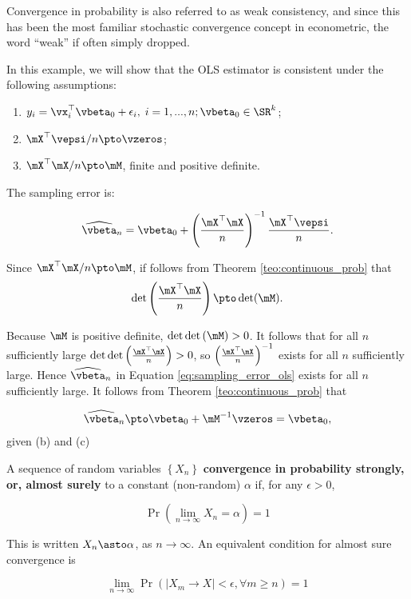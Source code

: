 \documentclass[english,12pt]{book}\usepackage[]{graphicx}\usepackage[]{xcolor}
\begin{document}
\begin{remark}
Convergence in probability is also referred to as weak consistency, and since this has been the most familiar stochastic convergence concept in econometric, the word ``weak'' if often simply dropped.
\end{remark}

\begin{example}\label{example:ols1}
In this example, we will show that the OLS estimator is consistent under the following assumptions:
\begin{enumerate}
\item $y_i = \vx_i^\top\vbeta_0 + \epsilon_i,\; i = 1, ..., n; \vbeta_0\in \SR^k$;
\item $\mX^\top\vepsi/n \pto \vzeros$;
\item $\mX^\top\mX/n\pto \mM$, finite and positive definite. 
\end{enumerate}

The sampling error is:

\begin{equation}\label{eq:sampling_error_ols}
\widehat{\vbeta}_n = \vbeta_0 + \left(\frac{\mX^\top\mX}{n}\right)^{-1}\frac{\mX^\top\vepsi}{n}.
\end{equation}

 Since $\mX^\top\mX/n\pto \mM$, if follows from Theorem \ref{teo:continuous_prob} that 
 \begin{equation}
 \det\left(\frac{\mX^\top\mX}{n}\right)\pto \det(\mM).
 \end{equation}

Because $\mM$ is positive definite, $\det\det\left(\mM\right) > 0$. It follows that for all $n$ sufficiently large $\det\det\left(\frac{\mX^\top\mX}{n}\right) > 0$, so $\left(\frac{\mX^\top\mX}{n}\right)^{-1}$ exists for all $n$ sufficiently large. Hence $\widehat{\vbeta}_n$ in Equation \eqref{eq:sampling_error_ols} exists for all $n$ sufficiently large. It follows from Theorem \ref{teo:continuous_prob} that

\begin{equation}
\widehat{\vbeta}_n\pto \vbeta_0 + \mM^{-1}\vzeros = \vbeta_0, 
\end{equation}
%
given (b) and (c)
\end{example}
\begin{definition}
	A sequence of random variables $\left\{X_n\right\}$ \textbf{convergence in probability strongly, or, almost surely} to a constant (non-random) $\alpha$ if, for any $\epsilon>0$,
	
	\begin{equation*}
	 \Pr\left(\lim_{n\to \infty}X_n = \alpha\right)=1
	\end{equation*}
	
	This is written $X_n\asto \alpha$, as $n\to \infty$. An equivalent condition for almost sure convergence is
	
	\begin{equation*}
	  \lim_{n\to \infty}\Pr\left(\left|X_m \to X\right| < \epsilon, \forall m\geq n\right) = 1
	\end{equation*}
\end{definition}
\end{document}
